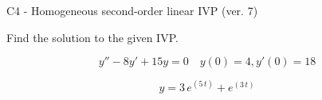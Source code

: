 \begin{exercise}
  \begin{exerciseTitle}C4 - Homogeneous second-order linear IVP (ver. 7)\end{exerciseTitle}
  \begin{exerciseStatement}
    
Find the solution to the given IVP.

    
\[y''-8y'+15y = 0 \hspace{1em} y(0) = 4 , y'(0) = 18\]

  \end{exerciseStatement}
  \begin{exerciseAnswer}
    
\[y= 3 \, e^{\left(5 \, t\right)} + e^{\left(3 \, t\right)}\]

  \end{exerciseAnswer}
\end{exercise}